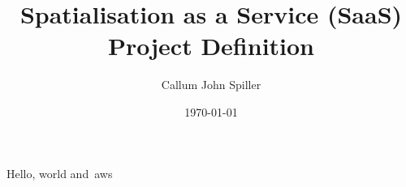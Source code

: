 \documentclass[12pt, british]{article}
\begin{document}
    \date{\today}
    \author{Callum John Spiller}

    \title{%
        Spatialisation as a Service (SaaS) \\
        \large Project Definition }

    \maketitle
    \newpage
    \tableofcontents
    \newpage

    Hello, world and~\gls{aws} ~\citep{cc_overview}

    
    
    \printindex
\end{document}
